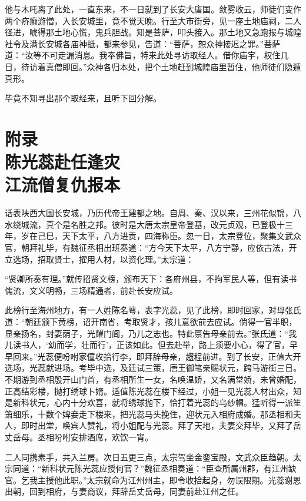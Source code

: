 \documentclass[12pt]{lsbook}
\begin{document}
他与木吒离了此处，一直东来，不一日就到了长安大唐国。敛雾收云，师徒们变作两个疥癫游憎，入长安城里，竟不觉天晚。行至大市街旁，见一座土地庙祠，二人径进，唬得那土地心慌，鬼兵胆战。知是菩萨，叩头接入。那土地又急跑报与城隍社令及满长安城各庙神抵，都来参见，告道：“菩萨，恕众神接迟之罪。”菩萨道：“汝等不可走漏消息。我奉佛旨，特来此处寻访取经人。借你庙宇，权住几日，待访着真僧即回。”众神各归本处，把个土地赶到城隍庙里暂住，他师徒们隐遁真形。

毕竟不知寻出那个取经来，且听下回分解。
\chapter[附\quad 录\ \ 陈光蕊赴任逢灾\ 江流僧复仇报本]{附\quad 录\\ 陈光蕊赴任逢灾\\ 江流僧复仇报本}\label{fulu}

话表陕西大国长安城，乃历代帝王建都之地。自周、秦、汉以来，三州花似锦，八水绕城流，真个是名胜之邦。彼时是大唐太宗皇帝登基，改元贞观，已登极十三年，岁在己巳，天下太平，八方进贡，四海称臣。忽一日，太宗登位，聚集文武众官，朝拜礼毕，有魏征丞相出班奏道：“方今天下太平，八方宁静，应依古法，开立选场，招取贤士，擢用人材，以资化理。”太宗道：

“贤卿所奏有理。”就传招贤文榜，颁布天下：各府州县，不拘军民人等，但有读书儒流，文义明畅，三场精通者，前赴长安应试。

此榜行至海州地方，有一人姓陈名萼，表字光蕊，见了此榜，即时回家，对母张氏道：“朝廷颁下黄榜，诏开南省，考取贤才，孩儿意欲前去应试。倘得一官半职，显亲扬名，封妻荫子，光耀门闾，乃儿之志也。特此禀告母亲前去。”张氏道：“我儿读书人，‘幼而学，壮而行’，正该如此。但去赴举，路上须要小心，得了官，早早回来。”光蕊便吩咐家僮收拾行李，即拜辞母亲，趱程前进。到了长安，正值大开选场，光蕊就进场。考毕中选，及廷试三策，唐王御笔亲赐状元，跨马游街三日。不期游到丞相殷开山门首，有丞相所生一女，名唤温娇，又名满堂娇，未曾婚配，正高结彩楼，抛打绣球卜婿。适值陈光蕊在楼下经过，小姐一见光蕊人材出众，知是新科状元，心内十分欢喜，就将绣球抛下，恰打着光蕊的乌纱帽。猛听得一派笙箫细乐，十数个婢妾走下楼来，把光蕊马头挽住，迎状元入相府成婚。那丞相和夫人，即时出堂，唤宾人赞礼，将小姐配与光蕊。拜了天地，夫妻交拜毕，又拜了岳丈岳母。丞相吩咐安排酒席，欢饮一宵。

二人同携素手，共入兰房。次日五更三点，太宗驾坐金銮宝殿，文武众臣趋朝。太宗同道：“新科状元陈光蕊应授何官？”魏征丞相奏道：“臣查所属州郡，有江州缺官。乞我主授他此职。”太宗就命为江州州主，即令收拾起身，勿误限期。光蕊谢恩出朝，回到相府，与妻商议，拜辞岳丈岳母，同妻前赴江州之任。
\end{document}
